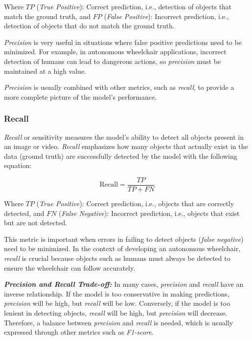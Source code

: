 Where \(TP\) (\emph{True Positive}): Correct prediction, i.e., detection of objects that match the ground truth, and \(FP\) (\emph{False Positive}): Incorrect prediction, i.e., detection of objects that do not match the ground truth.

\emph{Precision} is very useful in situations where false positive predictions need to be minimized. For example, in autonomous wheelchair applications, incorrect detection of humans can lead to dangerous actions, so \emph{precision} must be maintained at a high value.

\emph{Precision} is usually combined with other metrics, such as \emph{recall}, to provide a more complete picture of the model's performance.

\vspace{5pt}
\subsubsection{Recall}
\label{subsubsec:recall}

\emph{Recall} or sensitivity measures the model's ability to detect all objects present in an image or video. \emph{Recall} emphasizes how many objects that actually exist in the data (ground truth) are successfully detected by the model with the following equation:

\begin{equation}
  \mathrm{Recall} = \frac{TP}{TP + FN}
\end{equation}

Where \(TP\) (\emph{True Positive}): Correct prediction, i.e., objects that are correctly detected, and \(FN\) (\emph{False Negative}): Incorrect prediction, i.e., objects that exist but are not detected.

This metric is important when errors in failing to detect objects (\emph{false negative}) need to be minimized. In the context of developing an autonomous wheelchair, \emph{recall} is crucial because objects such as humans must always be detected to ensure the wheelchair can follow accurately.

\textbf{\emph{Precision and Recall Trade-off:}} In many cases, \emph{precision} and \emph{recall} have an inverse relationship. If the model is too conservative in making predictions, \emph{precision} will be high, but \emph{recall} will be low. Conversely, if the model is too lenient in detecting objects, \emph{recall} will be high, but \emph{precision} will decrease. Therefore, a balance between \emph{precision} and \emph{recall} is needed, which is usually expressed through other metrics such as \emph{F1-score}.

